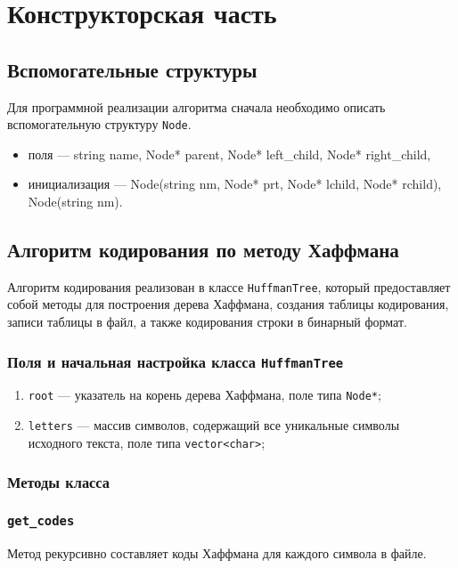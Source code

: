 \chapter{Конструкторская часть}

\section{Вспомогательные структуры} 
Для программной реализации алгоритма сначала необходимо описать вспомогательную структуру \texttt{Node}.
\begin{itemize}
	\item поля --- string name, Node* parent,	Node* left\_child, Node* right\_child,
	\item инициализация --- Node(string nm, Node* prt, Node* lchild, Node* rchild), Node(str\-ing nm).
\end{itemize}

\section{Алгоритм кодирования по методу Хаффмана}
Алгоритм кодирования реализован в классе \texttt{HuffmanTree}, который предоставляет собой методы для построения дерева Хаффмана, создания таблицы кодирования, записи таблицы в файл, а также кодирования строки в бинарный формат.

\subsection*{Поля и начальная настройка класса \texttt{HuffmanTree}}
\begin{enumerate}
	\item \texttt{root} --- указатель на корень дерева Хаффмана, поле типа \texttt{Node*};	
	\item \texttt{letters} --- массив символов, содержащий все уникальные символы исходного текста, поле типа \texttt{vector<char>};
\end{enumerate}

\subsection*{Методы класса}

\subsection{\texttt{get\_codes}}
Метод рекурсивно составляет коды Хаффмана для каждого символа в файле.

